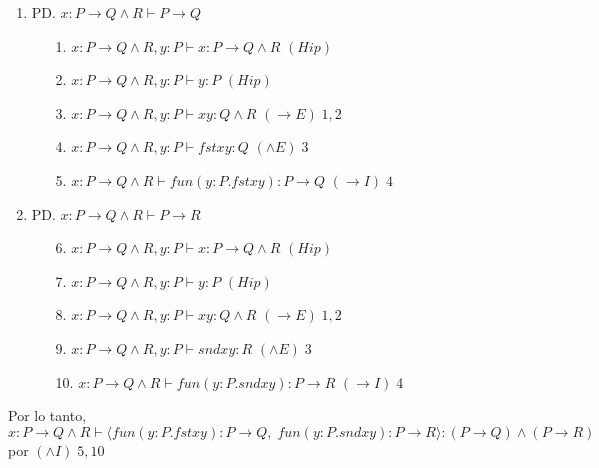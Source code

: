 \documentclass[letterpaper,12pt]{article}
\begin{document}
\begin{enumerate}
    \begin{enumerate}
        \item PD. $x: P \rightarrow Q \land R \vdash P \rightarrow Q$
        
        \begin{enumerate}
            \item[1.] $x: P \rightarrow Q \land R, y: P \vdash x: P \rightarrow Q \land R$ \; \; \; \; \; $(Hip)$
            \item[2.] $x: P \rightarrow Q \land R, y: P \vdash y: P$ \; \; \; \; \; \; \;  \; \; \; \; \; $(Hip)$
            \item[3.] $x: P \rightarrow Q \land R, y: P \vdash xy: Q \land R$ \; \; \; \; \; \; \; \; $(\rightarrow E) \; 1,2$ 
            \item[4.] $x: P \rightarrow Q \land R, y: P \vdash fst xy: Q$ \; \; \; \; \; \; \; \; \; $(\land E) \; 3$ 
            \item[5.] $x: P \rightarrow Q \land R \vdash fun(y: P.fst xy): P \rightarrow Q$ \; \;$(\rightarrow I) \; 4$   
        \end{enumerate}

        \item PD. $x: P \rightarrow Q \land R \vdash P \rightarrow R$
        
        \begin{enumerate}
            \item[6.] $x: P \rightarrow Q \land R, y: P \vdash x: P \rightarrow Q \land R$ \; \; \; \; \; $(Hip)$
            \item[7.] $x: P \rightarrow Q \land R, y: P \vdash y: P$ \; \; \; \; \; \; \;  \; \; \; \; \; $(Hip)$
            \item[8.] $x: P \rightarrow Q \land R, y: P \vdash xy: Q \land R$ \; \; \; \; \; \; \; \; $(\rightarrow E) \; 1,2$
            \item[9.] $x: P \rightarrow Q \land R, y: P \vdash snd xy: R$  \; \; \; \; \; \; \; \; \; $(\land E) \; 3$ 
            \item[10.] $x: P \rightarrow Q \land R \vdash fun(y: P.snd xy): P \rightarrow R$ \; \;$(\rightarrow I) \; 4$
        \end{enumerate}
    \end{enumerate}
    
    Por lo tanto, $x: P \rightarrow Q \land R \vdash \langle fun(y: P.fst xy): P \rightarrow Q, \; 
    fun(y: P.snd xy): P \rightarrow R \rangle : (P \rightarrow Q) \land (P \rightarrow R)$ por $(\land I) \; 5, 10$
    
\end{enumerate}
\end{document}
